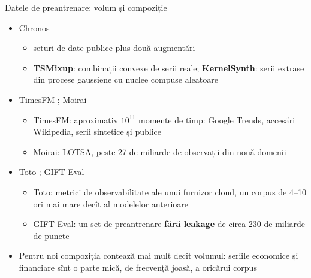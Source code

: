 \begin{frame}{Datele de preantrenare: volum și compoziție}
\itemsize{\small}
\begin{itemize}
    \item Chronos 
    \begin{itemize}
        \item seturi de date publice plus două augmentări
        \item \textbf{TSMixup}: combinații convexe de serii reale; \textbf{KernelSynth}: serii extrase din procese gaussiene cu nuclee compuse aleatoare
    \end{itemize}
    \item TimesFM ; Moirai 
    \begin{itemize}
        \item TimesFM: aproximativ $10^{11}$ momente de timp: Google Trends, accesări Wikipedia, serii sintetice și publice
        \item Moirai: LOTSA, peste 27 de miliarde de observații din nouă domenii
    \end{itemize}
    \item Toto ; GIFT-Eval 
    \begin{itemize}
        \item Toto: metrici de observabilitate ale unui furnizor cloud, un corpus de 4--10 ori mai mare decît al modelelor anterioare
        \item GIFT-Eval: un set de preantrenare \textbf{fără leakage} de circa 230 de miliarde de puncte
    \end{itemize}
    \item Pentru noi compoziția contează mai mult decît volumul: seriile economice și financiare sînt o parte mică, de frecvență joasă, a oricărui corpus
\end{itemize}
\end{frame}

